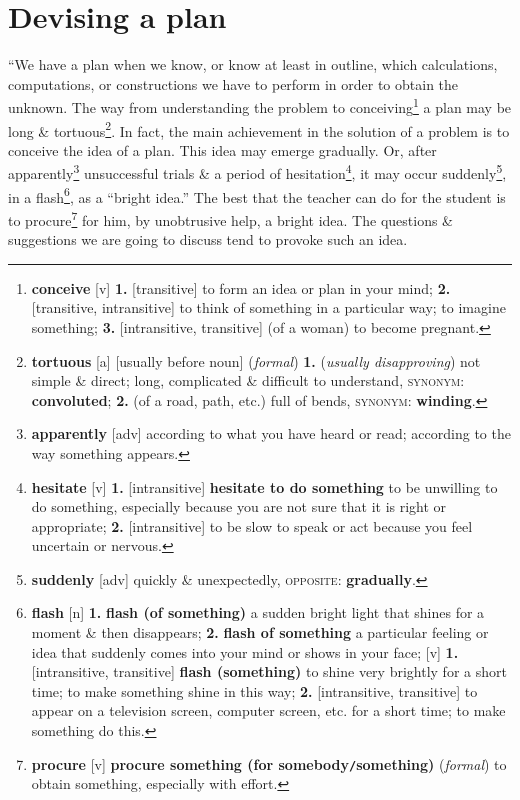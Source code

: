 \documentclass[oneside]{book}
\numberwithin{equation}{section}
\begin{document}
\section{Devising a plan}
``We have a plan when we know, or know at least in outline, which calculations, computations, or constructions we have to perform in order to obtain the unknown. The way from understanding the problem to conceiving\footnote{\textbf{conceive} [v] \textbf{1.} [transitive] to form an idea or plan in your mind; \textbf{2.} [transitive, intransitive] to think of something in a particular way; to imagine something; \textbf{3.} [intransitive, transitive] (of a woman) to become pregnant.} a plan may be long \& tortuous\footnote{\textbf{tortuous} [a] [usually before noun] (\textit{formal}) \textbf{1.} (\textit{usually disapproving}) not simple \& direct; long, complicated \& difficult to understand, \textsc{synonym}: \textbf{convoluted}; \textbf{2.} (of a road, path, etc.) full of bends, \textsc{synonym}: \textbf{winding}.}. In fact, the main achievement in the solution of a problem is to conceive the idea of a plan. This idea may emerge gradually. Or, after apparently\footnote{\textbf{apparently} [adv] according to what you have heard or read; according to the way something appears.} unsuccessful trials \& a period of hesitation\footnote{\textbf{hesitate} [v] \textbf{1.} [intransitive] \textbf{hesitate to do something} to be unwilling to do something, especially because you are not sure that it is right or appropriate; \textbf{2.} [intransitive] to be slow to speak or act because you feel uncertain or nervous.}, it may occur suddenly\footnote{\textbf{suddenly} [adv] quickly \& unexpectedly, \textsc{opposite}: \textbf{gradually}.}, in a flash\footnote{\textbf{flash} [n] \textbf{1.} \textbf{flash (of something)} a sudden bright light that shines for a moment \& then disappears; \textbf{2.} \textbf{flash of something} a particular feeling or idea that suddenly comes into your mind or shows in your face; [v] \textbf{1.} [intransitive, transitive] \textbf{flash (something)} to shine very brightly for a short time; to make something shine in this way; \textbf{2.} [intransitive, transitive] to appear on a television screen, computer screen, etc. for a short time; to make something do this.}, as a ``bright idea.'' The best that the teacher can do for the student is to procure\footnote{\textbf{procure} [v] \textbf{procure something (for somebody\texttt{/}something)} (\textit{formal}) to obtain something, especially with effort.} for him, by unobtrusive help, a bright idea. The questions \& suggestions we are going to discuss tend to provoke such an idea.
\end{document}

